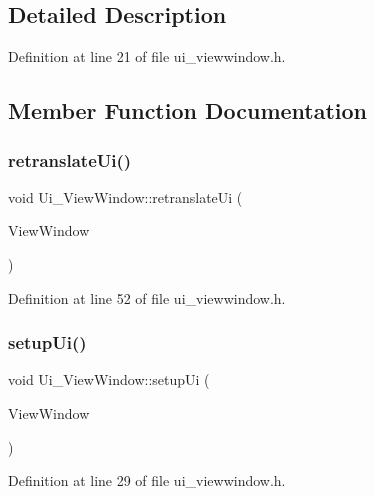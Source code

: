 \subsection{Detailed Description}


Definition at line 21 of file ui\+\_\+viewwindow.\+h.



\subsection{Member Function Documentation}
\mbox{\label{class_ui___view_window_a6f1b9fe6e15e336d2a9821ffbbcc561e}} 
\subsubsection{\texorpdfstring{retranslateUi()}{retranslateUi()}}
{\footnotesize\ttfamily void Ui\+\_\+\+View\+Window\+::retranslate\+Ui (\begin{DoxyParamCaption}\item[{Q\+Widget $\ast$}]{View\+Window }\end{DoxyParamCaption})\hspace{0.3cm}{\ttfamily [inline]}}



Definition at line 52 of file ui\+\_\+viewwindow.\+h.

\mbox{\label{class_ui___view_window_ae518c45a0141518ec16947cbf5eee3fb}} 
\subsubsection{\texorpdfstring{setupUi()}{setupUi()}}
{\footnotesize\ttfamily void Ui\+\_\+\+View\+Window\+::setup\+Ui (\begin{DoxyParamCaption}\item[{Q\+Widget $\ast$}]{View\+Window }\end{DoxyParamCaption})\hspace{0.3cm}{\ttfamily [inline]}}



Definition at line 29 of file ui\+\_\+viewwindow.\+h.



